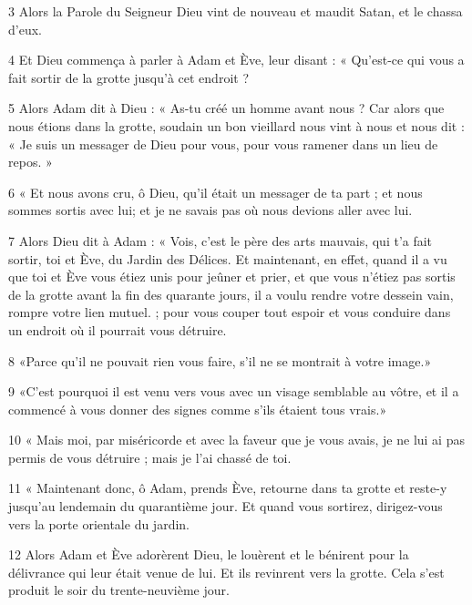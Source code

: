 \par 3 Alors la Parole du Seigneur Dieu vint de nouveau et maudit Satan, et le chassa d'eux.

\par 4 Et Dieu commença à parler à Adam et Ève, leur disant : « Qu'est-ce qui vous a fait sortir de la grotte jusqu'à cet endroit ?

\par 5 Alors Adam dit à Dieu : « As-tu créé un homme avant nous ? Car alors que nous étions dans la grotte, soudain un bon vieillard nous vint à nous et nous dit : « Je suis un messager de Dieu pour vous, pour vous ramener dans un lieu de repos. »

\par 6 « Et nous avons cru, ô Dieu, qu'il était un messager de ta part ; et nous sommes sortis avec lui; et je ne savais pas où nous devions aller avec lui.

\par 7 Alors Dieu dit à Adam : « Vois, c'est le père des arts mauvais, qui t'a fait sortir, toi et Ève, du Jardin des Délices. Et maintenant, en effet, quand il a vu que toi et Ève vous étiez unis pour jeûner et prier, et que vous n'étiez pas sortis de la grotte avant la fin des quarante jours, il a voulu rendre votre dessein vain, rompre votre lien mutuel. ; pour vous couper tout espoir et vous conduire dans un endroit où il pourrait vous détruire.

\par 8 «Parce qu'il ne pouvait rien vous faire, s'il ne se montrait à votre image.»

\par 9 «C'est pourquoi il est venu vers vous avec un visage semblable au vôtre, et il a commencé à vous donner des signes comme s'ils étaient tous vrais.»

\par 10 « Mais moi, par miséricorde et avec la faveur que je vous avais, je ne lui ai pas permis de vous détruire ; mais je l'ai chassé de toi.

\par 11 « Maintenant donc, ô Adam, prends Ève, retourne dans ta grotte et reste-y jusqu'au lendemain du quarantième jour. Et quand vous sortirez, dirigez-vous vers la porte orientale du jardin.

\par 12 Alors Adam et Ève adorèrent Dieu, le louèrent et le bénirent pour la délivrance qui leur était venue de lui. Et ils revinrent vers la grotte. Cela s'est produit le soir du trente-neuvième jour.

